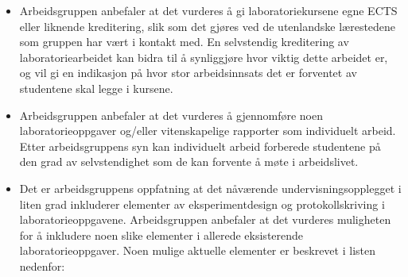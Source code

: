 \documentclass{article}
\begin{document}
\begin{itemize}
  \item Arbeidsgruppen anbefaler at det vurderes å gi laboratoriekursene egne ECTS eller liknende kreditering, slik som det gjøres ved de utenlandske lærestedene som gruppen har vært i kontakt med. En selvstendig kreditering av laboratoriearbeidet kan bidra til å synliggjøre hvor viktig dette arbeidet er, og vil gi en indikasjon på hvor stor arbeidsinnsats det er forventet av studentene skal legge i kursene.

  \item Arbeidsgruppen anbefaler at det vurderes å gjennomføre noen laboratorieoppgaver og/eller vitenskapelige rapporter som individuelt arbeid. Etter arbeidsgruppens syn kan individuelt arbeid forberede studentene på den grad av selvstendighet som de kan forvente å møte i arbeidslivet.

  \item Det er arbeidsgruppens oppfatning at det nåværende undervisningsopplegget i liten grad inkluderer elementer av eksperimentdesign og protokollskriving i laboratorieoppgavene. Arbeidsgruppen anbefaler at det vurderes muligheten for å inkludere noen slike elementer i allerede eksisterende laboratorieoppgaver. Noen mulige aktuelle elementer er beskrevet i listen nedenfor:
    

\end{itemize}
\end{document}
